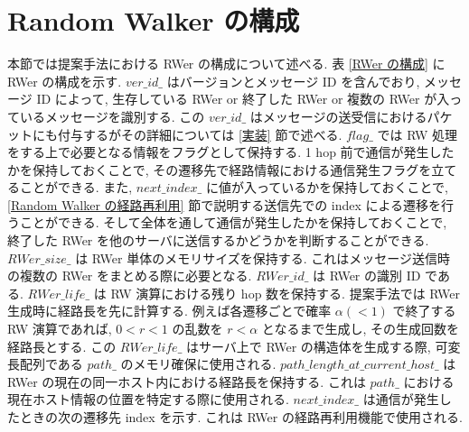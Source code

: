\section{Random Walker の構成}\label{Random Walker の構成}

本節では提案手法における RWer の構成について述べる. 表 \ref{RWer の構成} に RWer の構成を示す. $ver\_id\_$ はバージョンとメッセージ ID を含んでおり, メッセージ ID によって, 生存している RWer or 終了した RWer or 複数の RWer が入っているメッセージを識別する. この $ver\_id\_$ はメッセージの送受信におけるパケットにも付与するがその詳細については \ref{実装} 節で述べる. $flag\_$ では RW 処理をする上で必要となる情報をフラグとして保持する. 1 hop 前で通信が発生したかを保持しておくことで, その遷移先で経路情報における通信発生フラグを立てることができる. また, $next\_index\_$ に値が入っているかを保持しておくことで, \ref{Random Walker の経路再利用} 節で説明する送信先での index による遷移を行うことができる. そして全体を通して通信が発生したかを保持しておくことで, 終了した RWer を他のサーバに送信するかどうかを判断することができる. $RWer\_size\_$ は RWer 単体のメモリサイズを保持する. これはメッセージ送信時の複数の RWer をまとめる際に必要となる. $RWer\_id\_$ は RWer の識別 ID である. $RWer\_life\_$ は RW 演算における残り hop 数を保持する. 提案手法では RWer 生成時に経路長を先に計算する. 例えば各遷移ごとで確率 $\alpha (< 1)$ で終了する RW 演算であれば, $0 < r < 1$ の乱数を $r < \alpha$ となるまで生成し, その生成回数を経路長とする. この $RWer\_life\_$ はサーバ上で RWer の構造体を生成する際, 可変長配列である $path\_$ のメモリ確保に使用される. $path\_length\_at\_current\_host\_$ は RWer の現在の同一ホスト内における経路長を保持する. これは $path\_$ における現在ホスト情報の位置を特定する際に使用される. $next\_index\_$ は通信が発生したときの次の遷移先 index を示す. これは RWer の経路再利用機能で使用される. 

